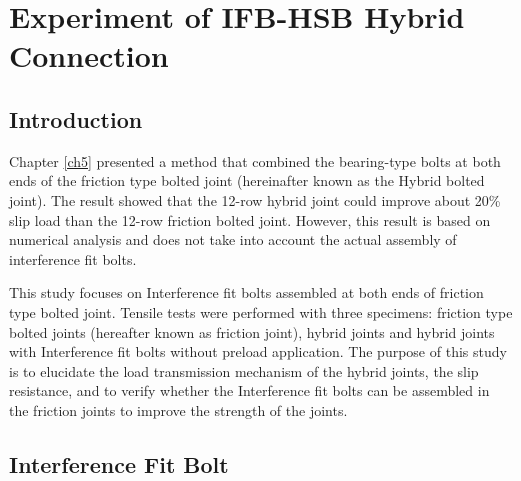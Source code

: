 \chapter{Experiment of IFB-HSB Hybrid Connection}
\label{ch6}

\begin{spacing}{1.25} %
\minitoc %
\end{spacing} %
\onehalfspacing %

\section{Introduction}

Chapter \ref{ch5} presented a method that combined the bearing-type bolts at both ends of the friction type bolted joint (hereinafter known as the Hybrid bolted joint). The result showed that the 12-row hybrid joint could improve about 20\% slip load than the 12-row friction bolted joint. However, this result is based on numerical analysis and does not take into account the actual assembly of interference fit bolts.

This study focuses on Interference fit bolts assembled at both ends of friction type bolted joint. Tensile tests were performed with three specimens: friction type bolted joints (hereafter known as friction joint), hybrid joints and hybrid joints with Interference fit bolts without preload application. The purpose of this study is to elucidate the load transmission mechanism of the hybrid joints, the slip resistance, and to verify whether the Interference fit bolts can be assembled in the friction joints to improve the strength of the joints.


\section{Interference Fit Bolt}

